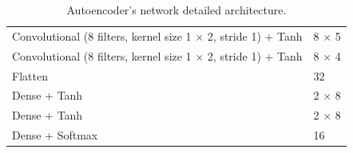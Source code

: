 \begin{table}[tp!]
\begin{adjustbox}{width=0.85\columnwidth,center}
\begin{tabular}{|l|l|}
			Convolutional (8 filters, kernel size 1 $\times$ 2, stride 1) + Tanh 	&   8 $\times$ 5		\\
			Convolutional (8 filters, kernel size 1 $\times$ 2, stride 1) + Tanh 	&   8 $\times$ 4		\\
			Flatten															 		&   32					\\
			Dense + Tanh															&	2 $\times$ 8		\\
			Dense + Tanh															&	2 $\times$ 8		\\
			Dense + Softmax															&	16					\\ 
			\hline
		\end{tabular}
	\end{adjustbox}
	\caption{Autoencoder's network detailed architecture.}
	\label{table:autoencoder_structure}
\end{table}
